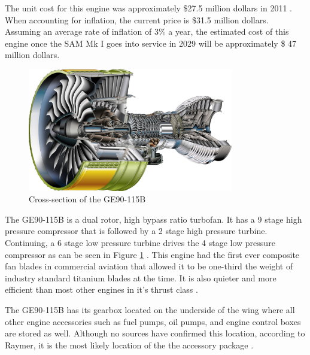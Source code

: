 The unit cost for this engine was approximately \$27.5 million dollars in 2011 \cite{gecost}. When accounting for inflation, the current price is \$31.5 million dollars. Assuming an average rate of inflation of 3\% a year, the estimated cost of this engine once the SAM Mk I goes into service in 2029 will be approximately \$ 47 million dollars.

\begin{figure} [h!]
    \centering
    \includegraphics[width=0.8\textwidth]{Photos/ge90cross.jpg}
    \caption{Cross-section of the GE90-115B}
    \label{fig:GeCross}
\end{figure}

The GE90-115B is a dual rotor, high bypass ratio turbofan. It has a 9 stage high pressure compressor that is followed by a 2 stage high pressure turbine. Continuing, a 6 stage low pressure turbine drives the 4 stage low pressure compressor as can be seen in Figure \ref{fig:GeCross} \cite{gecross}. This engine had the first ever composite fan blades in commercial aviation that allowed it to be one-third the weight of industry standard titanium blades at the time. It is also quieter and more efficient than most other engines in it's thrust class \cite{ge90}.

The GE90-115B has its gearbox located on the underside of the wing where all other engine accessories such as fuel pumps, oil pumps, and engine control boxes are stored as well. Although no sources have confirmed this location, according to Raymer, it is the most likely location of the the accessory package \cite{raymer}.


